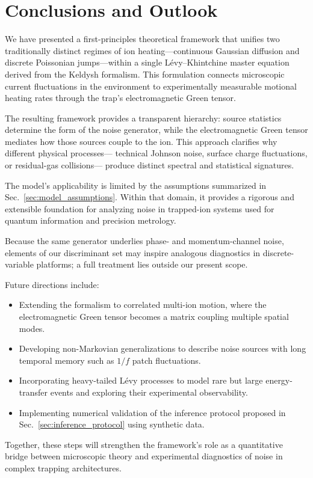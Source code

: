 \section{Conclusions and Outlook}
\label{sec:conclusion}

We have presented a first-principles theoretical framework that unifies
two traditionally distinct regimes of ion heating---continuous Gaussian diffusion
and discrete Poissonian jumps---within a single Lévy–Khintchine master equation
derived from the Keldysh formalism.
This formulation connects microscopic current fluctuations in the environment
to experimentally measurable motional heating rates through the trap's
electromagnetic Green tensor.

The resulting framework provides a transparent hierarchy:
source statistics determine the form of the noise generator,
while the electromagnetic Green tensor mediates how those sources couple to the ion.
This approach clarifies why different physical processes---
technical Johnson noise, surface charge fluctuations, or residual-gas collisions---
produce distinct spectral and statistical signatures.

The model's applicability is limited by the assumptions summarized in
Sec.~\ref{sec:model_assumptions}.
Within that domain, it provides a rigorous and extensible foundation
for analyzing noise in trapped-ion systems used for quantum information
and precision metrology.

Because the same generator underlies phase- and momentum-channel noise, elements of our discriminant set may inspire analogous diagnostics in discrete-variable platforms; a full treatment lies outside our present scope.

Future directions include:
\begin{itemize}
  \item Extending the formalism to correlated multi-ion motion,
        where the electromagnetic Green tensor becomes a matrix coupling multiple spatial modes.
  \item Developing non-Markovian generalizations to describe noise sources
        with long temporal memory such as \(1/f\) patch fluctuations.
  \item Incorporating heavy-tailed Lévy processes to model rare but large
        energy-transfer events and exploring their experimental observability.
  \item Implementing numerical validation of the inference protocol
        proposed in Sec.~\ref{sec:inference_protocol} using synthetic data.
\end{itemize}

Together, these steps will strengthen the framework's role as a quantitative bridge
between microscopic theory and experimental diagnostics of noise
in complex trapping architectures.

